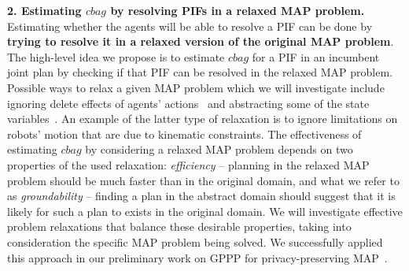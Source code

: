 \documentclass[11pt]{article}
\begin{document}
{\bf 2. Estimating $cbag$ by resolving PIFs in a relaxed MAP problem.} 
Estimating whether the agents will be able to resolve a PIF can be done by {\bf trying to resolve it in a relaxed version of the original MAP problem}.  The high-level idea we propose is to estimate $cbag$ for a PIF in an incumbent  joint plan by checking if that PIF can be resolved in the relaxed MAP problem. Possible ways to relax a given MAP problem which we will investigate include ignoring delete effects of agents' actions~\cite{hoffmann2005ignoring,domshlak2015red,vstolba2014relaxation} and abstracting some of the state variables~\cite{edelkamp2001planning,korf2002disjoint,felner2004additive,helmert2014merge,maliah2015privacy}. An example of the latter type of relaxation is to ignore limitations on robots' motion that are due to kinematic constraints.
The effectiveness of estimating $cbag$ by considering a relaxed MAP problem depends on two properties of the used relaxation: {\em efficiency} -- planning in the relaxed MAP problem should be much faster than in the original domain, and what we refer to as {\em groundability} -- finding a plan in the abstract domain should suggest that it is likely for such a plan to exists in the original domain. We will investigate effective problem relaxations that balance these desirable properties, taking into consideration the specific MAP problem being solved. We successfully applied this approach in our preliminary work on GPPP for privacy-preserving MAP~\cite{maliah2014privacyPreserving,maliah2015privacy}. 












\end{document}
